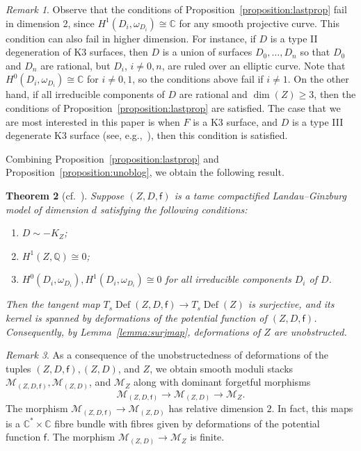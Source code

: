 \documentclass[10pt]{amsart}
\numberwithin{equation}{section}
\theoremstyle{plain}
\newtheorem{theorem}{Theorem}[section]
\theoremstyle{definition}
\theoremstyle{remark}
\newtheorem{remark}[theorem]{Remark}
\DeclareMathOperator{\Def}{Def}
\begin{document}
\begin{remark}
  Observe that the conditions of Proposition~\ref{proposition:lastprop} fail in dimension 2, since \(H^1(D_i,\omega_{D_i}) \cong \mathbb{C}\) for any smooth projective curve. This condition can also fail in higher dimension. For instance, if \(D\) is a type II degeneration of K3 surfaces, then \(D\) is a union of surfaces \(D_0, \ldots, D_n\) so that \(D_0\) and \(D_n\) are rational, but \(D_i\), \(i \neq 0,n\), are ruled over an elliptic curve. Note that \(H^0(D_i,\omega_{D_i}) \cong \mathbb{C}\) for \(i \neq 0,1\), so the conditions above fail if \(i \neq 1\). On the other hand, if all irreducible components of \(D\) are rational and \(\dim(Z) \geq 3\), then the conditions of Proposition~\ref{proposition:lastprop} are satisfied. The case that we are most interested in this paper is when \(F\) is a K3 surface, and \(D\) is a type III degenerate K3 surface (see, e.g.,~\cite{kulikov1977degenerations}), then this condition is satisfied.
\end{remark}

Combining Proposition~\ref{proposition:lastprop} and Proposition~\ref{proposition:unoblog}, we obtain the following result.
\begin{theorem}[cf.~{\cite[Corollary 2.18]{katzarkov2017bogomolov}}]\label{theorem:main1}
  Suppose \((Z,D,\mathsf{f})\) is a tame compactified Landau--Ginzburg model of dimension \(d\) satisfying the following conditions:
  \begin{enumerate}[\quad (a)]
  \item \(D \sim -K_Z\);
  \item \(H^1(Z,\mathbb{Q})\cong 0\);
  \item \(H^0(D_i,\omega_{D_i}), H^1(D_i,\omega_{D_i}) \cong 0\) for all irreducible components \(D_i\) of \(D\).
  \end{enumerate}
  Then the tangent map \(T_s \Def(Z,D,\mathsf{f}) \rightarrow T_s \Def(Z)\) is surjective, and its kernel is spanned by deformations of the potential function of \((Z,D,\mathsf{f})\). Consequently, by Lemma~\ref{lemma:surjmap}, deformations of \(Z\) are unobstructed.
\end{theorem}

\begin{remark}
  As a consequence of the unobstructedness of deformations of the tuples \((Z,D,\mathsf{f}), (Z,D)\), and \(Z\), we obtain smooth moduli stacks \(\mathcal{M}_{(Z,D,\mathsf{f})}, \mathcal{M}_{(Z,D)}\), and \(\mathcal{M}_Z\) along with dominant forgetful morphisms
  \[
    \mathcal{M}_{(Z,D,\mathsf{f})} \rightarrow \mathcal{M}_{(Z,D)} \rightarrow \mathcal{M}_Z.
  \]
  The morphism \(\mathcal{M}_{(Z,D,\mathsf{f})}\rightarrow \mathcal{M}_{(Z,D)}\) has relative dimension \(2\). In fact, this maps is a \(\mathbb{C}^* \times \mathbb{C}\) fibre bundle with fibres given by deformations of the potential function \(\mathsf{f}\). The morphism \(\mathcal{M}_{(Z,D)}\rightarrow\mathcal{M}_Z\) is finite.
\end{remark}
\end{document}
